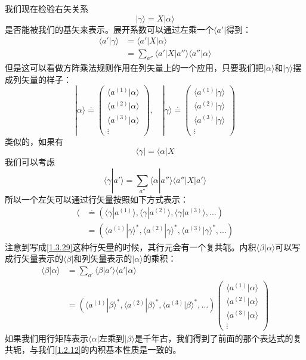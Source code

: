 \documentclass[UTF8,twoside]{ctexart}
\def\be{\begin{equation}}
\def\ee{\end{equation}}
\begin{document}
我们现在检验右矢关系
\be
|\gamma\rangle = X|\alpha\rangle
\ee
是否能被我们的基矢来表示。展开系数可以通过左乘一个$\langle a'|$得到：
\be\begin{split}
\langle a'|\gamma\rangle &= \langle a'|X|\alpha\rangle\\
&=\sum_{a''} \langle a'|X|a''\rangle\langle a''|\alpha\rangle
\end{split}\ee
但是这可以看做方阵乘法规则作用在列矢量上的一个应用，只要我们把$|\alpha\rangle$和$|\gamma\rangle$摆成列矢量的样子：
\be
|\alpha\rangle \overset{\cdot}{=} \left(\begin{matrix}
\langle a^{(1)}|\alpha\rangle\\
\langle a^{(2)}|\alpha\rangle\\
\langle a^{(3)}|\alpha\rangle\\
\vdots
\end{matrix}\right),\quad |\gamma\rangle \overset{\cdot}{=}\left(\begin{matrix}
\langle a^{(1)}|\gamma\rangle\\
\langle a^{(2)}|\gamma\rangle\\
\langle a^{(3)}|\gamma\rangle\\
\vdots
\end{matrix}\right)
\ee
类似的，如果有
\be
\langle\gamma| = \langle\alpha|X
\ee
我们可以考虑
\be
\langle \gamma|a'\rangle = \sum_{a''}\langle \alpha|a''\rangle\langle a''|X|a'\rangle
\ee
所以一个左矢可以通过行矢量按照如下方式表示：
\be\label{1.3.29}\begin{split}
\langle &\overset{\cdot}{=} (\langle\gamma|a^{(1)}\rangle,\langle\gamma|a^{(2)}\rangle,\langle\gamma|a^{(3)}\rangle,\ldots)\\
&=(\langle a^{(1)}|\gamma\rangle^*,\langle a^{(2)}|\gamma\rangle^*,\langle a^{(3)}|\gamma\rangle^*,\ldots)
\end{split}\ee
注意到写成\eqref{1.3.29}这种行矢量的时候，其行元会有一个复共轭。内积$\langle\beta|\alpha\rangle$可以写成行矢量表示的$\langle\beta|$和列矢量表示的$|\alpha\rangle$的乘积：
\be\begin{split}
\langle\beta|\alpha\rangle &= \sum_{a'}\langle\beta|a'\rangle\langle a'|\alpha\rangle\\
&=(\langle a^{(1)}|\beta\rangle^*,\langle a^{(2)}|\beta\rangle^*,\langle a^{(3)}|\beta\rangle^*,\ldots) \left(\begin{matrix}
\langle a^{(1)}|\alpha\rangle\\
\langle a^{(2)}|\alpha\rangle\\
\langle a^{(3)}|\alpha\rangle\\
\vdots
\end{matrix}\right)
\end{split}\ee
如果我们用行矩阵表示$\langle\alpha|$左乘到$|\beta\rangle$是千年古，我们得到了前面的那个表达式的复共轭，与我们\eqref{1.2.12}的内积基本性质是一致的。
\end{document}
